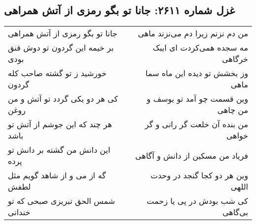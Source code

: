 \begin{center}
\section*{غزل شماره ۲۶۱۱: جانا تو بگو رمزی از آتش همراهی}
\label{sec:2611}
\begin{longtable}{l p{0.5cm} r}
جانا تو بگو رمزی از آتش همراهی
&&
من دم نزنم زیرا دم می‌نزند ماهی
\\
بر خیمه این گردون تو دوش قنق بودی
&&
مه سجده همی‌کردت ای ایبک خرگاهی
\\
خورشید ز تو گشته صاحب کله گردون
&&
وز بخشش تو دیده این ماه سما ماهی
\\
کی هر دو یکی گردد تو آتش و من روغن
&&
وین قسمت چو آمد تو یوسف و من چاهی
\\
هر چند که این جوشم از آتش تو باشد
&&
من بنده آن خلعت گر رانی و گر خواهی
\\
این دانش من گشته بر دانش تو پرده
&&
فریاد من مسکین از دانش و آگاهی
\\
گه از می و از شاهد گویم مثل لطفش
&&
وین هر دو کجا گنجد در وحدت اللهی
\\
شمس الحق تبریزی صبحی که تو خندانی
&&
کی شب بودش در پی یا زحمت بی‌گاهی
\\
\end{longtable}
\end{center}
